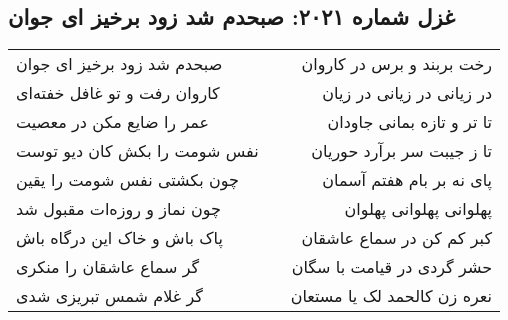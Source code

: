 \begin{center}
\section*{غزل شماره ۲۰۲۱: صبحدم شد زود برخیز ای جوان}
\label{sec:2021}
\begin{longtable}{l p{0.5cm} r}
صبحدم شد زود برخیز ای جوان
&&
رخت بربند و برس در کاروان
\\
کاروان رفت و تو غافل خفته‌ای
&&
در زیانی در زیانی در زیان
\\
عمر را ضایع مکن در معصیت
&&
تا تر و تازه بمانی جاودان
\\
نفس شومت را بکش کان دیو توست
&&
تا ز جیبت سر برآرد حوریان
\\
چون بکشتی نفس شومت را یقین
&&
پای نه بر بام هفتم آسمان
\\
چون نماز و روزه‌ات مقبول شد
&&
پهلوانی پهلوانی پهلوان
\\
پاک باش و خاک این درگاه باش
&&
کبر کم کن در سماع عاشقان
\\
گر سماع عاشقان را منکری
&&
حشر گردی در قیامت با سگان
\\
گر غلام شمس تبریزی شدی
&&
نعره زن کالحمد لک یا مستعان
\\
\end{longtable}
\end{center}
